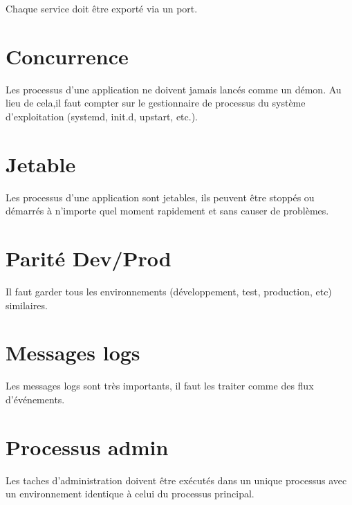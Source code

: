 Chaque service doit être exporté via un port.

\section*{Concurrence}

Les processus d'une application ne doivent jamais lancés comme un démon. Au lieu de cela,il faut compter sur le gestionnaire de processus du système d'exploitation (systemd, init.d, upstart, etc.).

\section*{Jetable}

Les processus d'une application sont jetables, ils peuvent être stoppés ou démarrés à n'importe quel moment rapidement et sans causer de problèmes.

\section*{Parité Dev/Prod}

Il faut garder tous les environnements (développement, test, production, etc) similaires.

\section*{Messages logs}

Les messages logs sont très importants, il faut les traiter comme des flux d'événements.

\section*{Processus admin}

Les taches d'administration doivent être exécutés dans un unique processus avec un environnement identique à celui du processus principal.